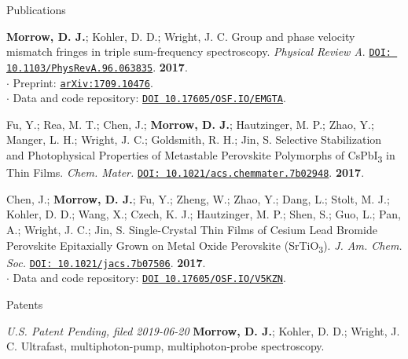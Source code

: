 \documentclass{resume} %
\begin{document}
\begin{rSection}{Publications}
\begin{etaremune}
\item \textbf{Morrow, D. J.}; Kohler, D. D.; Wright, J. C. Group and phase velocity mismatch fringes in triple sum-frequency spectroscopy. \emph{Physical Review A}. \href{https://journals.aps.org/pra/abstract/10.1103/PhysRevA.96.063835}{\texttt{DOI: 10.1103/PhysRevA.96.063835}}. \textbf{2017}.\\
$\cdot$ Preprint: \href{http://arxiv.org/abs/1709.10476}{\texttt{arXiv:1709.10476}}. \\
$\cdot$ Data and code repository: \href{https://osf.io/emgta/}{\texttt{DOI 10.17605/OSF.IO/EMGTA}}.

\item Fu, Y.; Rea, M. T.; Chen, J.; \textbf{Morrow, D. J.}; Hautzinger, M. P.; Zhao, Y.; Manger, L. H.; Wright, J. C.; Goldsmith, R. H.; Jin, S. Selective Stabilization and Photophysical Properties of
Metastable Perovskite Polymorphs of CsPbI\textsubscript{3} in Thin Films. \emph{Chem. Mater.} \href{http://pubs.acs.org/doi/10.1021/acs.chemmater.7b02948}{\texttt{DOI: 10.1021/acs.chemmater.7b02948}}. \textbf{2017}. 
 
\item Chen, J.; \textbf{Morrow, D. J.}; Fu, Y.; Zheng, W.; Zhao, Y.; Dang, L.; Stolt, M. J.; Kohler, D. D.; Wang, X.; Czech, K. J.; Hautzinger, M. P.; Shen, S.; Guo, L.; Pan, A.; Wright, J. C.; Jin, S. Single-Crystal Thin Films of Cesium Lead Bromide Perovskite Epitaxially Grown on Metal Oxide Perovskite (SrTiO\textsubscript{3}). \emph{J. Am. Chem. Soc.} \href{http://pubs.acs.org/doi/10.1021/jacs.7b07506}{\texttt{DOI: 10.1021/jacs.7b07506}}. \textbf{2017}. \\
$\cdot$ Data and code repository: \href{https://osf.io/v5kzn/}{\texttt{DOI 10.17605/OSF.IO/V5KZN}}.
	



\end{etaremune}

\end{rSection}

\begin{rSection}{Patents}
	\begin{etaremune}
		\item[] \textit{U.S. Patent Pending, filed 2019-06-20} \textbf{Morrow, D. J.}; Kohler, D. D.; Wright, J. C. Ultrafast, multiphoton-pump, multiphoton-probe spectroscopy. 		
	\end{etaremune}	
\end{rSection}
\end{document}
